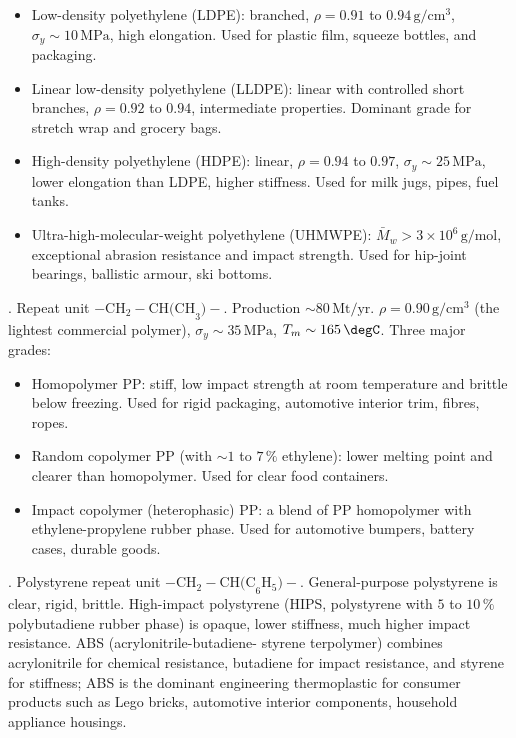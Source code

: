 \begin{itemize}[leftmargin=*]
\item Low-density polyethylene (LDPE): branched, $\rho = 0.91$ to
  $0.94\,\text{g}/\text{cm}^3$, $\sigma_y \sim 10\,\text{MPa}$, high
  elongation. Used for plastic film, squeeze bottles, and packaging.
\item Linear low-density polyethylene (LLDPE): linear with controlled
  short branches, $\rho = 0.92$ to $0.94$, intermediate properties.
  Dominant grade for stretch wrap and grocery bags.
\item High-density polyethylene (HDPE): linear, $\rho = 0.94$ to
  $0.97$, $\sigma_y \sim 25\,\text{MPa}$, lower elongation than LDPE,
  higher stiffness. Used for milk jugs, pipes, fuel tanks.
\item Ultra-high-molecular-weight polyethylene (UHMWPE):
  $\bar{M}_w > 3 \times 10^6\,\text{g}/\text{mol}$, exceptional
  abrasion resistance and impact strength. Used for hip-joint
  bearings, ballistic armour, ski bottoms.
\end{itemize}

. Repeat unit
$-\text{CH}_2-\text{CH(CH}_3)-$. Production $\sim 80\,\text{Mt}/\text{yr}$.
$\rho = 0.90\,\text{g}/\text{cm}^3$ (the lightest commercial polymer),
$\sigma_y \sim 35\,\text{MPa}$, $T_m \sim 165\,\degC$. Three major
grades:

\begin{itemize}[leftmargin=*]
\item Homopolymer PP: stiff, low impact strength at room temperature
  and brittle below freezing. Used for rigid packaging, automotive
  interior trim, fibres, ropes.
\item Random copolymer PP (with $\sim 1$ to $7\,\%$ ethylene): lower
  melting point and clearer than homopolymer. Used for clear food
  containers.
\item Impact copolymer (heterophasic) PP: a blend of PP homopolymer
  with ethylene-propylene rubber phase. Used for automotive bumpers,
  battery cases, durable goods.
\end{itemize}

. Polystyrene repeat unit
$-\text{CH}_2-\text{CH(C}_6\text{H}_5)-$. General-purpose polystyrene
is clear, rigid, brittle. High-impact polystyrene (HIPS, polystyrene
with $5$ to $10\,\%$ polybutadiene rubber phase) is opaque, lower
stiffness, much higher impact resistance. ABS (acrylonitrile-butadiene-
styrene terpolymer) combines acrylonitrile for chemical resistance,
butadiene for impact resistance, and styrene for stiffness; ABS is
the dominant engineering thermoplastic for consumer products such as
Lego bricks, automotive interior components, household appliance
housings.


